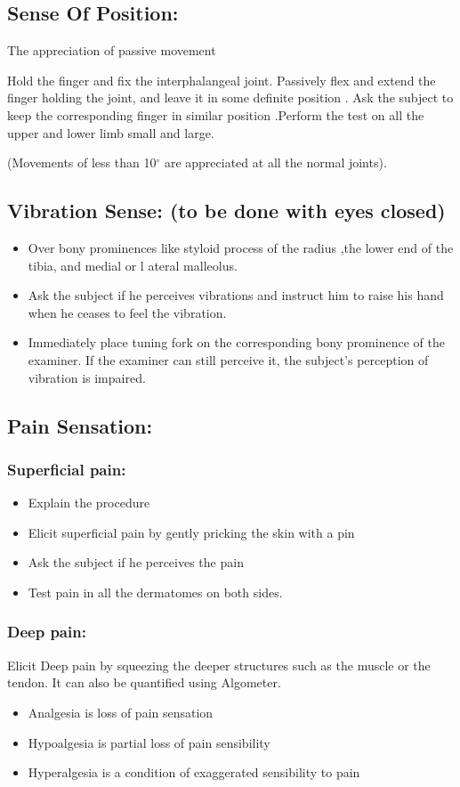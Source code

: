 \documentclass[a4paper,12pt,openany,twoside]{book}
\begin{document}
\subsection*{Sense Of Position:}
\par
The appreciation of passive movement
\par
	Hold the finger and fix the interphalangeal joint. Passively flex and extend the finger holding the joint, and leave it in some definite position . Ask the subject to keep the corresponding finger in similar position .Perform the test on all the upper and lower limb small and large.
	\par
(Movements of less than 10${^\circ}$ are appreciated at all the normal joints).
\subsection*{Vibration Sense: (to be done with eyes closed)}
\begin{itemize}
		\itemsep0em
\item{Over bony prominences like styloid process of the radius ,the lower end of the tibia, and medial or l ateral malleolus.}
\item{Ask the subject if he perceives vibrations and instruct him to raise his hand when he ceases to feel the vibration.}
\item{Immediately place tuning fork on the corresponding bony prominence of the examiner. If the examiner can still perceive it, the subject's perception of vibration is impaired.}
\end{itemize}
\subsection*{Pain Sensation:}
\subsubsection*{Superficial pain:}
\begin{itemize}
		\itemsep0em
\item{Explain the procedure}
\item{Elicit superficial pain by gently pricking the skin with a pin}
\item{Ask the subject if he perceives the pain}
\item{Test pain in all the dermatomes on both sides.}
\end{itemize}
\subsubsection*{Deep pain:}
	Elicit Deep pain by squeezing the deeper structures such as the muscle or the tendon. It can also be quantified using Algometer.
	\begin{itemize}
			\itemsep0em
\item{Analgesia is loss of pain sensation}
\item{Hypoalgesia is partial loss of pain sensibility}
\item{Hyperalgesia is a condition of exaggerated sensibility to pain}
	\end{itemize}
\end{document}

